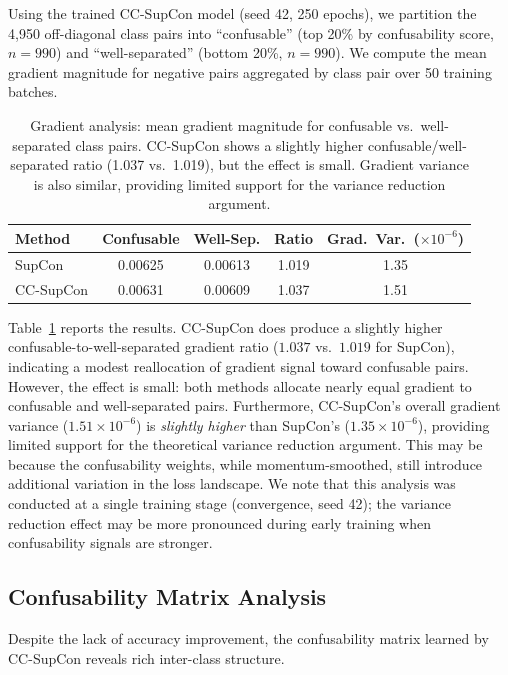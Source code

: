 \documentclass{article}
\begin{document}
Using the trained CC-SupCon model (seed 42, 250 epochs), we partition the 4,950 off-diagonal class pairs into ``confusable'' (top 20\% by confusability score, $n = 990$) and ``well-separated'' (bottom 20\%, $n = 990$). We compute the mean gradient magnitude for negative pairs aggregated by class pair over 50 training batches.

\begin{table}[t]
\caption{Gradient analysis: mean gradient magnitude for confusable vs.\ well-separated class pairs. CC-SupCon shows a slightly higher confusable/well-separated ratio (1.037 vs.\ 1.019), but the effect is small. Gradient variance is also similar, providing limited support for the variance reduction argument.}
\label{tab:gradient}
\centering
\begin{tabular}{lcccc}
\toprule
Method & Confusable & Well-Sep. & Ratio & Grad.\ Var.\ ($\times 10^{-6}$) \\
\midrule
SupCon & 0.00625 & 0.00613 & 1.019 & 1.35 \\
CC-SupCon & 0.00631 & 0.00609 & 1.037 & 1.51 \\
\bottomrule
\end{tabular}
\end{table}

Table~\ref{tab:gradient} reports the results. CC-SupCon does produce a slightly higher confusable-to-well-separated gradient ratio ($1.037$ vs.\ $1.019$ for SupCon), indicating a modest reallocation of gradient signal toward confusable pairs. However, the effect is small: both methods allocate nearly equal gradient to confusable and well-separated pairs. Furthermore, CC-SupCon's overall gradient variance ($1.51 \times 10^{-6}$) is \emph{slightly higher} than SupCon's ($1.35 \times 10^{-6}$), providing limited support for the theoretical variance reduction argument. This may be because the confusability weights, while momentum-smoothed, still introduce additional variation in the loss landscape. We note that this analysis was conducted at a single training stage (convergence, seed 42); the variance reduction effect may be more pronounced during early training when confusability signals are stronger.


\subsection{Confusability Matrix Analysis}
\label{sec:confusability_analysis}

Despite the lack of accuracy improvement, the confusability matrix learned by CC-SupCon reveals rich inter-class structure.
\end{document}
